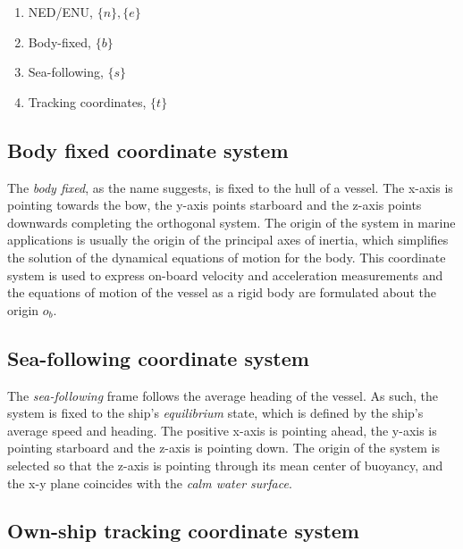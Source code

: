 \begin{enumerate}
	\item NED/ENU, $\{n\} , \{e\}$
	\item Body-fixed, $\{b\}$
	\item Sea-following, $\{s\}$
	\item Tracking coordinates, $\{t\}$
\end{enumerate}



\subsection{Body fixed coordinate system}


The \emph{body fixed}, as the name suggests, is fixed to the hull of a vessel. The x-axis is pointing towards the bow, the y-axis points starboard and the z-axis points downwards completing the orthogonal system. The origin of the system in marine applications is usually the origin of the principal axes of inertia, which simplifies the solution of the dynamical equations of motion for the body. This coordinate system is used to express on-board velocity and acceleration measurements and the equations of motion of the vessel as a rigid body are formulated about the origin $o_{b}$.

\subsection{Sea-following coordinate system}


The \emph{sea-following} frame follows the average heading of the vessel. As such, the system is fixed to the ship's \emph{equilibrium} state, which is defined by the ship's average speed and heading. The positive x-axis is pointing ahead, the y-axis is pointing starboard and the z-axis is pointing down. The origin of the system is selected so that the z-axis is pointing through its mean center of buoyancy, and the x-y plane coincides with the \emph{calm water surface}.

\subsection{Own-ship tracking coordinate system}


